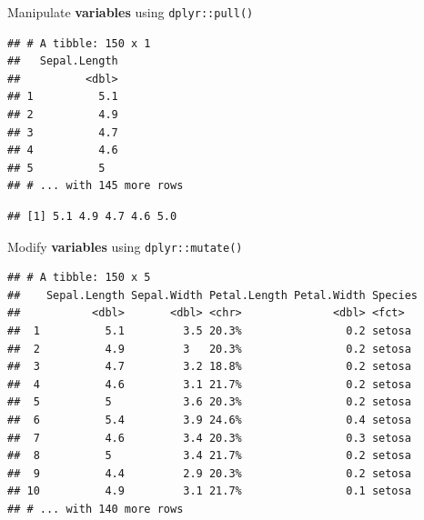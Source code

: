 \documentclass[14pt,ignorenonframetext,]{bredelebeamer}
\newenvironment{Shaded}{\begin{snugshade}}{\end{snugshade}}
\newcommand{\KeywordTok}[1]{\textcolor[rgb]{0.94,0.87,0.69}{#1}}
\newcommand{\DataTypeTok}[1]{\textcolor[rgb]{0.87,0.87,0.75}{#1}}
\newcommand{\StringTok}[1]{\textcolor[rgb]{0.80,0.58,0.58}{#1}}
\newcommand{\OperatorTok}[1]{\textcolor[rgb]{0.94,0.94,0.82}{#1}}
\newcommand{\NormalTok}[1]{\textcolor[rgb]{0.80,0.80,0.80}{#1}}
\begin{document}
\begin{frame}[fragile]{Manipulate \textbf{variables} using
\texttt{dplyr::pull()}}

\begin{Shaded}
\end{Shaded}

\begin{verbatim}
## # A tibble: 150 x 1
##   Sepal.Length
##          <dbl>
## 1          5.1
## 2          4.9
## 3          4.7
## 4          4.6
## 5          5  
## # ... with 145 more rows
\end{verbatim}

\begin{Shaded}
\end{Shaded}

\begin{verbatim}
## [1] 5.1 4.9 4.7 4.6 5.0
\end{verbatim}

\end{frame}

\begin{frame}[fragile]{Modify \textbf{variables} using
\texttt{dplyr::mutate()}}

\begin{Shaded}
\end{Shaded}

\begin{verbatim}
## # A tibble: 150 x 5
##    Sepal.Length Sepal.Width Petal.Length Petal.Width Species
##           <dbl>       <dbl> <chr>              <dbl> <fct>  
##  1          5.1         3.5 20.3%                0.2 setosa 
##  2          4.9         3   20.3%                0.2 setosa 
##  3          4.7         3.2 18.8%                0.2 setosa 
##  4          4.6         3.1 21.7%                0.2 setosa 
##  5          5           3.6 20.3%                0.2 setosa 
##  6          5.4         3.9 24.6%                0.4 setosa 
##  7          4.6         3.4 20.3%                0.3 setosa 
##  8          5           3.4 21.7%                0.2 setosa 
##  9          4.4         2.9 20.3%                0.2 setosa 
## 10          4.9         3.1 21.7%                0.1 setosa 
## # ... with 140 more rows
\end{verbatim}

\end{frame}
\end{document}
